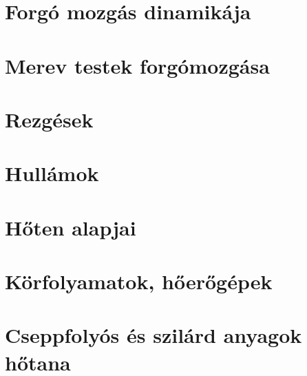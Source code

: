 \documentclass[12pt]{article}
\begin{document}

	\section{Forgó mozgás dinamikája}


	\section{Merev testek forgómozgása}


	\section{Rezgések}

	\section{Hullámok}

	\section{Hőten alapjai}

	\section{Körfolyamatok, hőerőgépek}

	\section{Cseppfolyós és szilárd anyagok hőtana}
\end{document}
